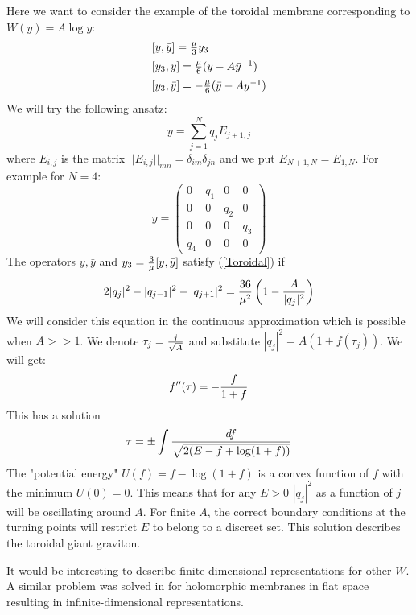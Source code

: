 \documentclass[a4paper,12pt]{article}
\begin{document}
Here we want to consider the example of the toroidal membrane
corresponding to $W(y)=A\log y$:
\begin{equation}\label{Toroidal}
\begin{array}{l}
[y,\bar{y}]={\mu\over 3}y_3\\[5pt]
[y_3,y]={\mu\over 6}(y-A\bar{y}^{-1})\\[5pt]
[y_3,\bar{y}]=-{\mu\over 6}(\bar{y}-A y^{-1})
\end{array}
\end{equation}
We will try the following ansatz:
\begin{equation}
y=\sum\limits_{j=1}^N q_j E_{j+1,j}
\end{equation}
where $E_{i,j}$ is the matrix $||E_{i,j}||_{mn}=\delta_{im}\delta_{jn}$
and we put $E_{N+1,N}=E_{1,N}$. For example for $N=4$:
\begin{equation}
y=\left(\begin{array}{cccc}
0   & q_1 & 0   & 0   \\
0   & 0   & q_2 & 0   \\
0   & 0   & 0   & q_3 \\
q_4 & 0   & 0   & 0  \end{array}\right)
\end{equation}
The operators $y,\bar{y}$ and $y_3={3\over\mu}[y,\bar{y}]$ satisfy
(\ref{Toroidal}) if
\begin{equation}
2|q_j|^2-|q_{j-1}|^2-|q_{j+1}|^2={36\over\mu^2}
\left(1-{A\over |q_j|^2}\right)
\end{equation}
We will consider this equation in the continuous approximation which is
possible when $A>>1$. We denote $\tau_j={j\over\sqrt{A}}$ and substitute
$|q_j|^2=A(1+f(\tau_j))$. We will get:
\begin{equation}
f''(\tau)=-{f\over 1+f}
\end{equation}
This has a solution
\begin{equation}
\tau=\pm\int{df\over\sqrt{2(E-f+\log(1+f))}}
\end{equation}
The "potential energy" $U(f)=f-\log(1+f)$ is a convex function of $f$ with
the minimum $U(0)=0$. This means that for any $E>0$ $|q_j|^2$ as a function of $j$
will be oscillating around $A$. For finite $A$, the correct boundary conditions at
the turning points will restrict $E$ to belong to a discreet set.
This solution describes the toroidal giant graviton.

It would be interesting to describe finite dimensional representations for
other $W$. A similar problem was solved in \cite{CornalbaTaylor} for holomorphic
membranes in flat space resulting in infinite-dimensional
representations.
\end{document}
